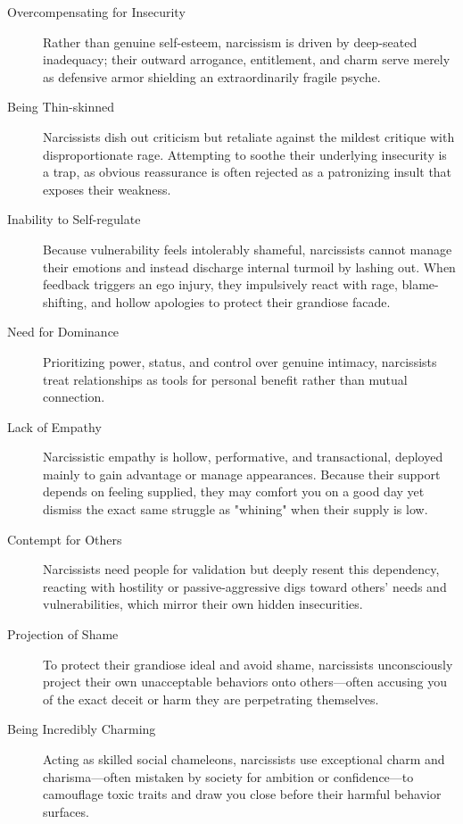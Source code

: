 \documentclass[11pt,letter]{article}
\begin{document}
\begin{description}
\item[Overcompensating for Insecurity]
Rather than genuine self-esteem, narcissism is driven by deep-seated inadequacy;
their outward arrogance, entitlement, and charm serve merely as defensive armor
shielding an extraordinarily fragile psyche.

\item[Being Thin-skinned]
Narcissists dish out criticism but retaliate against the mildest critique with
disproportionate rage. Attempting to soothe their underlying insecurity is a
trap, as obvious reassurance is often rejected as a patronizing insult that
exposes their weakness.

\item[Inability to Self-regulate]
Because vulnerability feels intolerably shameful, narcissists cannot manage
their emotions and instead discharge internal turmoil by lashing out. When
feedback triggers an ego injury, they impulsively react with rage,
blame-shifting, and hollow apologies to protect their grandiose facade.

\item[Need for Dominance]
Prioritizing power, status, and control over genuine intimacy, narcissists treat
relationships as tools for personal benefit rather than mutual connection.

\item[Lack of Empathy]
Narcissistic empathy is hollow, performative, and transactional, deployed
mainly to gain advantage or manage appearances. Because their support depends on
feeling supplied, they may comfort you on a good day yet dismiss the exact same
struggle as "whining" when their supply is low.

\item[Contempt for Others]
Narcissists need people for validation but deeply resent this dependency,
reacting with hostility or passive-aggressive digs toward others' needs and
vulnerabilities, which mirror their own hidden insecurities.

\item[Projection of Shame]
To protect their grandiose ideal and avoid shame, narcissists unconsciously
project their own unacceptable behaviors onto others—often accusing you of the
exact deceit or harm they are perpetrating themselves.

\item[Being Incredibly Charming]
Acting as skilled social chameleons, narcissists use exceptional charm and
charisma—often mistaken by society for ambition or confidence—to camouflage
toxic traits and draw you close before their harmful behavior surfaces.

\end{description}
\end{document}
